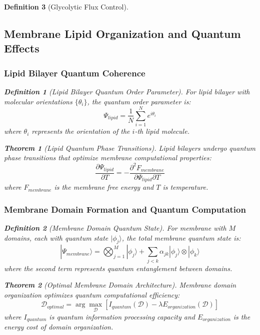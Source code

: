 \documentclass[12pt,a4paper]{article}
\newtheorem{theorem}{Theorem}
\newtheorem{definition}{Definition}
\begin{document}
\begin{definition}[Glycolytic Flux Control]
\subsection{Membrane Lipid Organization and Quantum Effects}

\subsubsection{Lipid Bilayer Quantum Coherence}

\begin{definition}[Lipid Bilayer Quantum Order Parameter]
For lipid bilayer with molecular orientations $\{\theta_i\}$, the quantum order parameter is:
\begin{equation}
\Psi_{lipid} = \frac{1}{N} \sum_{i=1}^{N} e^{i\theta_i}
\end{equation}
where $\theta_i$ represents the orientation of the $i$-th lipid molecule.
\end{definition}

\begin{theorem}[Lipid Quantum Phase Transitions]
Lipid bilayers undergo quantum phase transitions that optimize membrane computational properties:
\begin{equation}
\frac{\partial \Psi_{lipid}}{\partial T} = -\frac{\partial^2 F_{membrane}}{\partial \Psi_{lipid} \partial T}
\end{equation}
where $F_{membrane}$ is the membrane free energy and $T$ is temperature.
\end{theorem}

\subsubsection{Membrane Domain Formation and Quantum Computation}

\begin{definition}[Membrane Domain Quantum State]
For membrane with $M$ domains, each with quantum state $|\phi_j\rangle$, the total membrane quantum state is:
\begin{equation}
|\Psi_{membrane}\rangle = \bigotimes_{j=1}^{M} |\phi_j\rangle + \sum_{j<k} \alpha_{jk} |\phi_j\rangle \otimes |\phi_k\rangle
\end{equation}
where the second term represents quantum entanglement between domains.
\end{definition}

\begin{theorem}[Optimal Membrane Domain Architecture]
Membrane domain organization optimizes quantum computational efficiency:
\begin{equation}
\mathcal{D}_{optimal} = \arg\max_{\mathcal{D}} \left[ I_{quantum}(\mathcal{D}) - \lambda E_{organization}(\mathcal{D}) \right]
\end{equation}
where $I_{quantum}$ is quantum information processing capacity and $E_{organization}$ is the energy cost of domain organization.
\end{theorem}


\end{definition}
\end{document}
